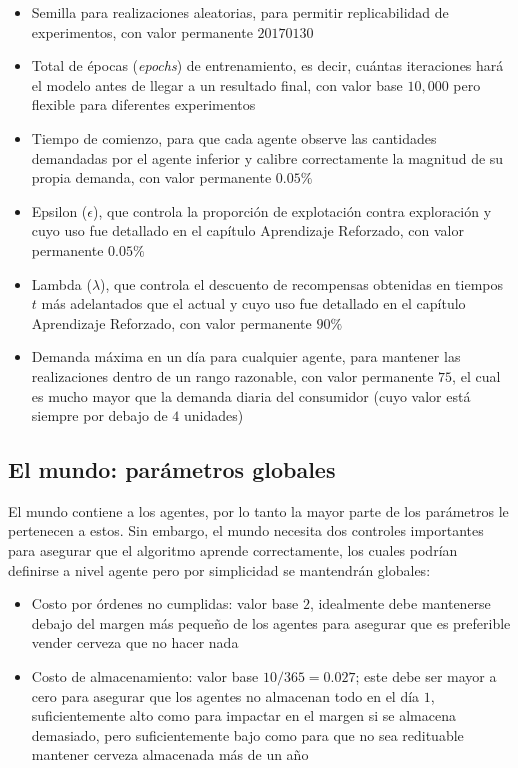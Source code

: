 \begin{itemize}
    \item Semilla para realizaciones aleatorias, para permitir replicabilidad de experimentos, con valor permanente $20170130$
    \item Total de \'epocas (\textit{epochs}) de entrenamiento, es decir, cu\'antas iteraciones har\'a el modelo antes de llegar a un resultado final, con valor base $10,000$ pero flexible para diferentes experimentos
    \item Tiempo de comienzo, para que cada agente observe las cantidades demandadas por el agente inferior y calibre correctamente la magnitud de su propia demanda, con valor permanente $0.05\%$
    \item Epsilon ($\epsilon$), que controla la proporci\'on de explotaci\'on contra exploraci\'on y cuyo uso fue detallado en el cap\'itulo Aprendizaje Reforzado, con valor permanente $0.05\%$
    \item Lambda ($\lambda$), que controla el descuento de recompensas obtenidas en tiempos $t$ m\'as adelantados que el actual y cuyo uso fue detallado en el cap\'itulo Aprendizaje Reforzado, con valor permanente $90\%$
    \item Demanda m\'axima en un d\'ia para cualquier agente, para mantener las realizaciones dentro de un rango razonable, con valor permanente $75$, el cual es mucho mayor que la demanda diaria del consumidor (cuyo valor est\'a siempre por debajo de $4$ unidades)
\end{itemize}

\subsection{El mundo: par\'ametros globales}

El mundo contiene a los agentes, por lo tanto la mayor parte de los par\'ametros le pertenecen a estos. Sin embargo, el mundo necesita dos controles importantes para asegurar que el algoritmo aprende correctamente, los cuales podr\'ian definirse a nivel agente pero por simplicidad se mantendr\'an globales:

\begin{itemize}
    \item Costo por \'ordenes no cumplidas: valor base $2$, idealmente debe mantenerse debajo del margen m\'as peque\~no de los agentes para asegurar que es preferible vender cerveza que no hacer nada
    \item Costo de almacenamiento: valor base $10/365 = 0.027$; este debe ser mayor a cero para asegurar que los agentes no almacenan todo en el d\'ia $1$, suficientemente alto como para impactar en el margen si se almacena demasiado, pero suficientemente bajo como para que no sea redituable mantener cerveza almacenada m\'as de un a\~no
\end{itemize}

